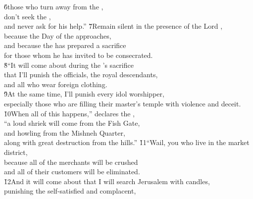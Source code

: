 \begin{poetry}
\poeml \v{6}those who turn away from the , \\
\poemll    don't seek the , \\
\poemlll       and never ask for his help.''
\poeml \v{7}Remain silent in the presence of the Lord , \\
\poemll    because the Day of the  approaches, \\
\poeml and because the  has prepared a sacrifice \\
\poemll    for those whom he has invited to be consecrated. \\
\poeml \v{8}``It will come about during the 's sacrifice \\
\poemll    that I'll punish the officials, the royal descendants, \\
\poemlll       and all who wear foreign clothing. \\
\poeml \v{9}At the same time, I'll punish every idol worshipper, \\
\poemll    especially those who are filling their master's temple with violence and deceit. \\
\poeml \v{10}When all of this happens,'' declares the , \\
\poemll    ``a loud shriek will come from the Fish Gate, \\
\poeml and howling from the Mishneh Quarter, \\
\poemll    along with great destruction from the hills.''
\poeml \v{11}``Wail, you who live in the market district, \\
\poemll    because all of the merchants will be crushed \\
\poemlll       and all of their customers will be eliminated. \\
\poeml \v{12}And it will come about that I will search Jerusalem with candles, \\
\poemll    punishing the self-satisfied and complacent, \\

\end{poetry}
